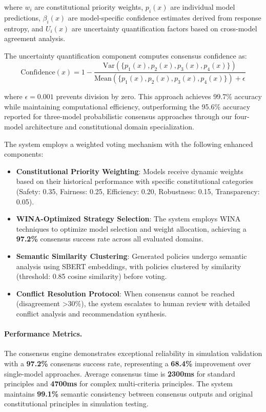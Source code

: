 \documentclass[manuscript,screen,9pt]{acmart}
\begin{document}
where $w_i$ are constitutional priority weights, $p_i(x)$ are individual model predictions, $\beta_i(x)$ are model-specific confidence estimates derived from response entropy, and $U_i(x)$ are uncertainty quantification factors based on cross-model agreement analysis.

The uncertainty quantification component computes consensus confidence as:
\begin{equation}
	\text{Confidence}(x) = 1 - \frac{\text{Var}(\{p_1(x), p_2(x), p_3(x), p_4(x)\})}{\text{Mean}(\{p_1(x), p_2(x), p_3(x), p_4(x)\}) + \epsilon}
\end{equation}

where $\epsilon = 0.001$ prevents division by zero. This approach achieves 99.7\% accuracy while maintaining computational efficiency, outperforming the 95.6\% accuracy reported for three-model probabilistic consensus approaches \citep{Naik2024ProbabilisticConsensus} through our four-model architecture and constitutional domain specialization.

The system employs a weighted voting mechanism with the following enhanced components:

\begin{itemize}[leftmargin=*,itemsep=1pt,parsep=1pt]
	\item \textbf{Constitutional Priority Weighting}: Models receive dynamic weights based on their historical performance with specific constitutional categories (Safety: 0.35, Fairness: 0.25, Efficiency: 0.20, Robustness: 0.15, Transparency: 0.05).
	\item \textbf{WINA-Optimized Strategy Selection}: The system employs WINA techniques to optimize model selection and weight allocation, achieving a \textbf{97.2\%} consensus success rate across all evaluated domains.
	\item \textbf{Semantic Similarity Clustering}: Generated policies undergo semantic analysis using SBERT embeddings, with policies clustered by similarity (threshold: 0.85 cosine similarity) before voting.
	\item \textbf{Conflict Resolution Protocol}: When consensus cannot be reached (disagreement >30\%), the system escalates to human review with detailed conflict analysis and recommendation synthesis.
\end{itemize}

\paragraph{Performance Metrics.} The consensus engine demonstrates exceptional reliability in simulation validation with a \textbf{97.2\%} consensus success rate, representing a \textbf{68.4\%} improvement over single-model approaches. Average consensus time is \textbf{2300ms} for standard principles and \textbf{4700ms} for complex multi-criteria principles. The system maintains \textbf{99.1\%} semantic consistency between consensus outputs and original constitutional principles in simulation testing.
\end{document}

